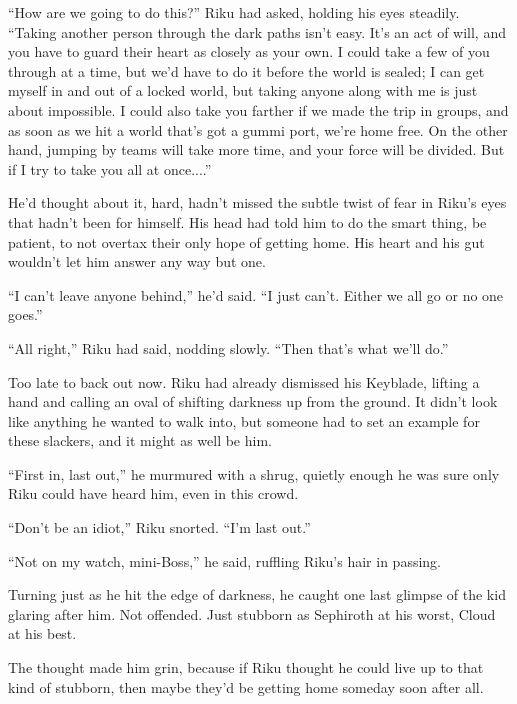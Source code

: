 ``How are we going to do this?'' Riku had asked, holding his eyes steadily. ``Taking another person through the dark paths isn't easy. It's an act of will, and you have to guard their heart as closely as your own. I could take a few of you through at a time, but we'd have to do it before the world is sealed; I can get myself in and out of a locked world, but taking anyone along with me is just about impossible. I could also take you farther if we made the trip in groups, and as soon as we hit a world that's got a gummi port, we're home free. On the other hand, jumping by teams will take more time, and your force will be divided. But if I try to take you all at once....''

He'd thought about it, hard, hadn't missed the subtle twist of fear in Riku's eyes that hadn't been for himself. His head had told him to do the smart thing, be patient, to not overtax their only hope of getting home. His heart and his gut wouldn't let him answer any way but one.

``I can't leave anyone behind,'' he'd said. ``I just can't. Either we all go or no one goes.''

``All right,'' Riku had said, nodding slowly. ``Then that's what we'll do.''

Too late to back out now. Riku had already dismissed his Keyblade, lifting a hand and calling an oval of shifting darkness up from the ground. It didn't look like anything he wanted to walk into, but someone had to set an example for these slackers, and it might as well be him.

``First in, last out,'' he murmured with a shrug, quietly enough he was sure only Riku could have heard him, even in this crowd.

``Don't be an idiot,'' Riku snorted. ``I'm last out.''

``Not on my watch, mini-Boss,'' he said, ruffling Riku's hair in passing.

Turning just as he hit the edge of darkness, he caught one last glimpse of the kid glaring after him. Not offended. Just stubborn as Sephiroth at his worst, Cloud at his best.

The thought made him grin, because if Riku thought he could live up to that kind of stubborn, then maybe they'd be getting home someday soon after all.

